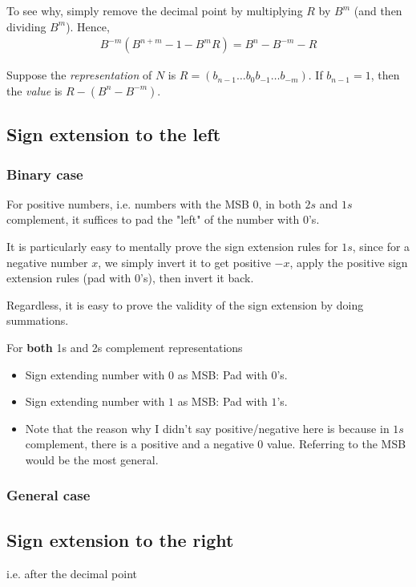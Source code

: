 \documentclass{article}
\begin{document}
To see why, simply remove the decimal point by multiplying $R$ by $B^m$ (and then dividing $B^m$).
Hence, \begin{align*}
	B^{-m}(B^{n+m} - 1 - B^mR) = B^n - B^{-m} - R
\end{align*}

Suppose the \textit{representation} of $N$ is $R=(b_{n-1}\dots b_0b_{-1}\dots b_{-m})$.
If $b_{n-1}=1$, then the \textit{value} is $R - (B^{n} - B^{-m})$.

\subsection{Sign extension to the left}
\subsubsection{Binary case}
For positive numbers, i.e. numbers with the MSB 0, in both $2s$ and $1s$ complement, it suffices to pad the "left" of the number with $0$'s.

It is particularly easy to mentally prove the sign extension rules for $1s$, since for a negative number $x$, we simply invert it to get positive $-x$, apply the positive sign extension rules (pad with $0$'s), then invert it back. 

Regardless, it is easy to prove the validity of the sign extension by doing summations.

For \textbf{both} 1s and 2s complement representations
\begin{itemize}
	\item Sign extending number with $0$ as MSB: Pad with $0$'s.
	\item Sign extending number with $1$ as MSB: Pad with $1$'s.
	\item Note that the reason why I didn't say positive/negative here is because in $1s$ complement, there is a positive and a negative $0$ value. Referring to the MSB would be the most general.
\end{itemize}

\subsubsection{General case}

\subsection{Sign extension to the right}
i.e. after the decimal point
\end{document}
